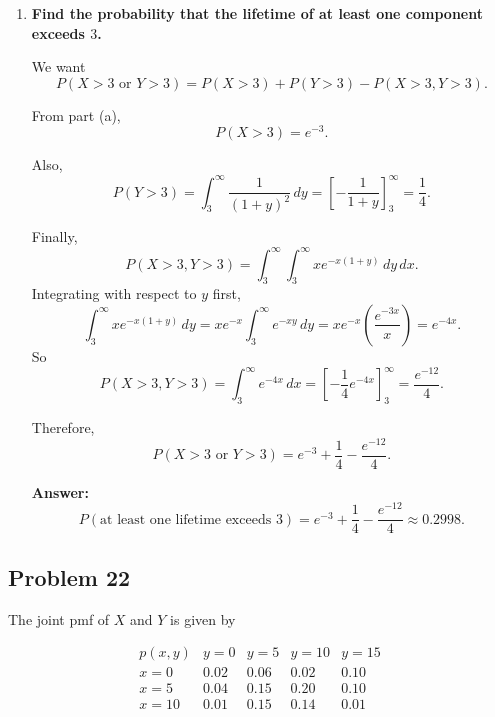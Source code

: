 \documentclass[11pt]{article}
\begin{document}
\begin{enumerate}
    \item[(c)] \textbf{Find the probability that the lifetime of at least one component exceeds $3$.}

    We want
    \[
    P(X>3 \text{ or } Y>3)=P(X>3)+P(Y>3)-P(X>3,Y>3).
    \]

    From part (a),
    \[
    P(X>3)=e^{-3}.
    \]

    Also,
    \[
    P(Y>3)=\int_3^\infty \frac{1}{(1+y)^2}\,dy
    =\left[-\frac{1}{1+y}\right]_3^\infty
    =\frac14.
    \]

    Finally,
    \[
    P(X>3,Y>3)=\int_3^\infty\int_3^\infty x e^{-x(1+y)}\,dy\,dx.
    \]
    Integrating with respect to $y$ first,
    \[
    \int_3^\infty x e^{-x(1+y)}\,dy
    =x e^{-x}\int_3^\infty e^{-xy}\,dy
    =x e^{-x}\left(\frac{e^{-3x}}{x}\right)=e^{-4x}.
    \]
    So
    \[
    P(X>3,Y>3)=\int_3^\infty e^{-4x}\,dx
    =\left[-\frac14 e^{-4x}\right]_3^\infty
    =\frac{e^{-12}}{4}.
    \]

    Therefore,
    \[
    P(X>3 \text{ or } Y>3)=e^{-3}+\frac14-\frac{e^{-12}}{4}.
    \]

    \textbf{Answer:}
    \[
    P(\text{at least one lifetime exceeds }3)=e^{-3}+\frac14-\frac{e^{-12}}{4}\approx 0.2998.
    \]
\end{enumerate}

\subsection*{Problem 22}

The joint pmf of $X$ and $Y$ is given by

\[
\begin{array}{c|cccc}
p(x,y) & y=0 & y=5 & y=10 & y=15\\
\hline
x=0 & 0.02 & 0.06 & 0.02 & 0.10\\
x=5 & 0.04 & 0.15 & 0.20 & 0.10\\
x=10 & 0.01 & 0.15 & 0.14 & 0.01
\end{array}
\]
\end{document}
